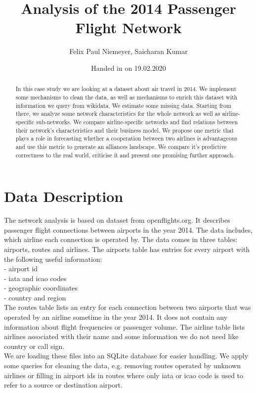 \documentclass[twocolumn]{tum-article}
\title{Analysis of the 2014 Passenger Flight Network}
\author{Felix Paul Niemeyer\authormark{1},
	Saicharan Kumar\authormark{2}}
\affil[1]{felix.niemeyer@tum.de, MiM}
\affil[2]{saicharan.kumar@tum.de, MiM}
\date{Handed in on 19.02.2020}
\begin{document}
\maketitle

\begin{abstract}
In this case study we are looking at a dataset about air travel in 2014. 
We implement some mechanisms to clean the data, as well as mechanisms to enrich this dataset with information we query from wikidata.
We estimate some missing data.
Starting from there, we analyze some network characteristics for the whole network as well as airline-specific sub-networks.
We compare airline-specific networks and find relations between their network's characteristics and their business model.
We propose one metric that plays a role in forecasting whether a cooperation between two airlines is advantageous and use this metric to generate an alliances landscape.
We compare it's predictive correctness to the real world, criticise it and present one promising further approach. 
\end{abstract}

\section{Data Description}
The network analysis is based on dataset from openflights.org. 
It describes passenger flight connections between airports in the year 2014. 
The data includes, which airline each connection is operated by.
The data comes in three tables: airports, routes and airlines. 
The airports table has entries for every airport with the following useful information: \\
- airport id\\
- iata and icao codes\\
- geographic coordinates\\
- country and region\\

The routes table lists an entry for each connection between two airports that was operated by an airline sometime in the year 2014. It does not contain any information about flight frequencies or passenger volume. The airline table lists airlines associated with their name and some information we do not need like country or call sign. \\

We are loading these files into an SQLite database for easier handling. 
We apply some queries for cleaning the data, e.g. removing routes operated by unknown airlines or filling in airport ids in routes where only iata or icao code is used to refer to a source or destination airport. \\
\end{document}
